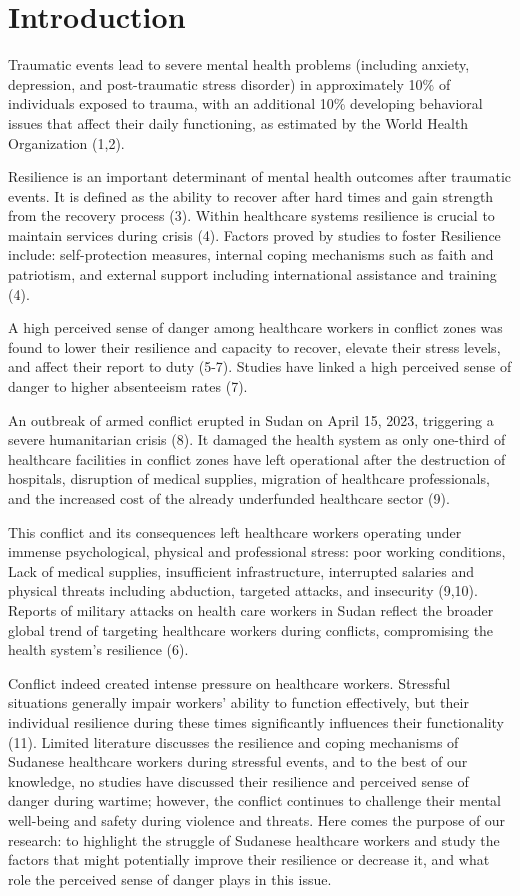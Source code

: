 \section{Introduction}
Traumatic events lead to severe mental health problems (including anxiety, depression, and post-traumatic stress disorder) in approximately 10\% of individuals exposed to trauma, with an additional 10\% developing behavioral issues that affect their daily functioning, as estimated by the World Health Organization (1,2).

Resilience is an important determinant of mental health outcomes after traumatic events. It is defined as the ability to recover after hard times and gain strength from the recovery process (3). Within healthcare systems resilience is crucial to maintain services during crisis (4). Factors proved by studies to foster Resilience include: self-protection measures, internal coping mechanisms such as faith and patriotism, and external support including international assistance and training (4).

A high perceived sense of danger among healthcare workers in conflict zones was found to lower their resilience and capacity to recover, elevate their stress levels, and affect their report to duty (5-7). Studies have linked a high perceived sense of danger to higher absenteeism rates (7).

An outbreak of armed conflict erupted in Sudan on April 15, 2023, triggering a severe humanitarian crisis (8). It damaged the health system as only one-third of healthcare facilities in conflict zones have left operational after the destruction of hospitals, disruption of medical supplies, migration of healthcare professionals, and the increased cost of the already underfunded healthcare sector (9).

This conflict and its consequences left healthcare workers operating under immense psychological, physical and professional stress: poor working conditions, Lack of medical supplies, insufficient infrastructure, interrupted salaries and physical threats including abduction, targeted attacks, and insecurity (9,10). Reports of military attacks on health care workers in Sudan reflect the broader global trend of targeting healthcare workers during conflicts, compromising the health system’s resilience (6).

Conflict indeed created intense pressure on healthcare workers. Stressful situations generally impair workers’ ability to function effectively, but their individual resilience during these times significantly influences their functionality (11). Limited literature discusses the resilience and coping mechanisms of Sudanese healthcare workers during stressful events, and to the best of our knowledge, no studies have discussed their resilience and perceived sense of danger during wartime; however, the conflict continues to challenge their mental well-being and safety during violence and threats. Here comes the purpose of our research: to highlight the struggle of Sudanese healthcare workers and study the factors that might potentially improve their resilience or decrease it, and what role the perceived sense of danger plays in this issue.

